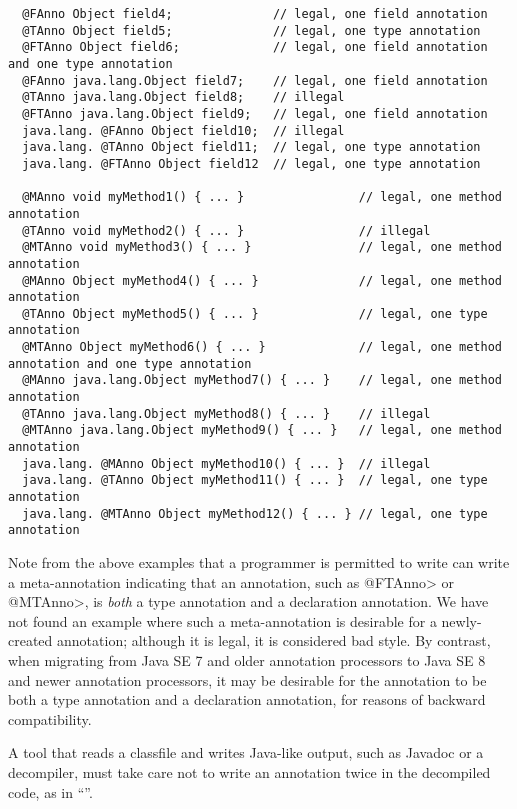 \documentclass[10pt]{article}
\begin{document}
\begin{Verbatim}
  @FAnno Object field4;              // legal, one field annotation
  @TAnno Object field5;              // legal, one type annotation
  @FTAnno Object field6;             // legal, one field annotation and one type annotation
  @FAnno java.lang.Object field7;    // legal, one field annotation
  @TAnno java.lang.Object field8;    // illegal
  @FTAnno java.lang.Object field9;   // legal, one field annotation
  java.lang. @FAnno Object field10;  // illegal
  java.lang. @TAnno Object field11;  // legal, one type annotation
  java.lang. @FTAnno Object field12  // legal, one type annotation

  @MAnno void myMethod1() { ... }                // legal, one method annotation
  @TAnno void myMethod2() { ... }                // illegal
  @MTAnno void myMethod3() { ... }               // legal, one method annotation
  @MAnno Object myMethod4() { ... }              // legal, one method annotation
  @TAnno Object myMethod5() { ... }              // legal, one type annotation
  @MTAnno Object myMethod6() { ... }             // legal, one method annotation and one type annotation
  @MAnno java.lang.Object myMethod7() { ... }    // legal, one method annotation
  @TAnno java.lang.Object myMethod8() { ... }    // illegal
  @MTAnno java.lang.Object myMethod9() { ... }   // legal, one method annotation
  java.lang. @MAnno Object myMethod10() { ... }  // illegal
  java.lang. @TAnno Object myMethod11() { ... }  // legal, one type annotation
  java.lang. @MTAnno Object myMethod12() { ... } // legal, one type annotation
\end{Verbatim}


Note from the above examples that a programmer is permitted to write can
write a  meta-annotation indicating that an annotation, such
as \<@FTAnno> or \<@MTAnno>, is \emph{both} a type annotation and a
declaration annotation.
We have not found an example where such a meta-annotation is desirable for
a newly-created annotation; although it is legal, it is considered bad style.
By contrast, when migrating from Java SE 7 and older annotation
processors to Java SE 8 and newer annotation processors, it may be
desirable for the annotation to be both a type annotation and a declaration
annotation, for reasons of backward compatibility.

A tool that reads a classfile and writes Java-like output, such as Javadoc
or a decompiler, must take care not to write an annotation twice in the
decompiled code, as in ``''.
\end{document}

